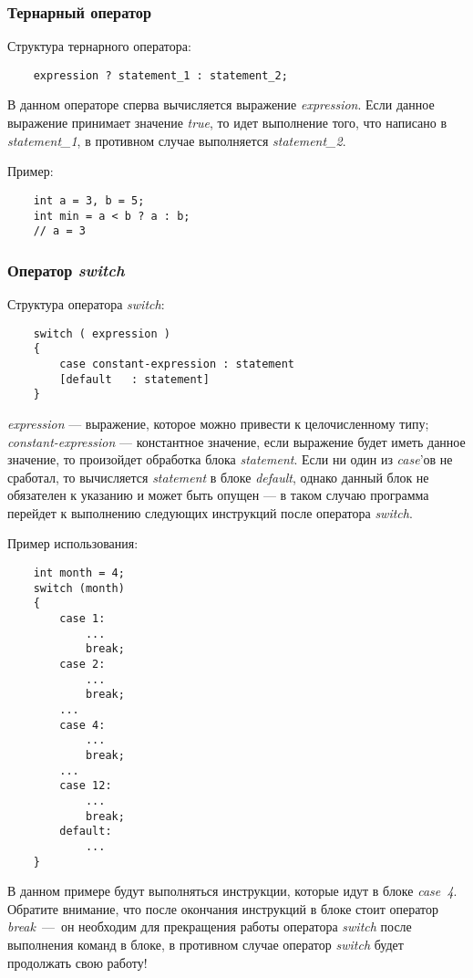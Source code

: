 \subsubsection{Тернарный оператор}
Структура тернарного оператора:

\begin{lstlisting}
    expression ? statement_1 : statement_2;
\end{lstlisting}

В данном операторе сперва вычисляется выражение \textit{expression}. Если данное выражение принимает значение \textit{true}, то идет выполнение того, что написано в \textit{statement\_1}, в противном случае выполняется \textit{statement\_2}.

Пример:
\begin{lstlisting}
    int a = 3, b = 5;
    int min = a < b ? a : b;
    // a = 3
\end{lstlisting}

\subsubsection{Оператор \textit{switch}}
Структура оператора \textit{switch}:
\begin{lstlisting}
    switch ( expression )
    {
        case constant-expression : statement
        [default   : statement]
    }
\end{lstlisting}

\textit{expression} --- выражение, которое можно привести к целочисленному типу; \textit{constant-expression} --- константное значение, если выражение будет иметь данное значение, то произойдет обработка блока \textit{statement}. Если ни один из \textit{case}'ов не сработал, то вычисляется \textit{statement} в блоке \textit{default}, однако данный блок не обязателен к указанию и может быть опущен --- в таком случаю программа перейдет к выполнению следующих инструкций после оператора \textit{switch}.

Пример использования:
\begin{lstlisting}
    int month = 4;
    switch (month)
    {
        case 1:
            ...
            break;
        case 2:
            ...
            break;
        ...
        case 4:
            ...
            break;
        ...
        case 12:
            ...
            break;
        default:
            ...
    }
\end{lstlisting}

В данном примере будут выполняться инструкции, которые идут в блоке \textit{case~4}. Обратите внимание, что после окончания инструкций в блоке стоит оператор \textit{break}~---~он необходим для прекращения работы оператора \textit{switch} после выполнения команд в блоке, в противном случае оператор \textit{switch} будет продолжать свою работу!

